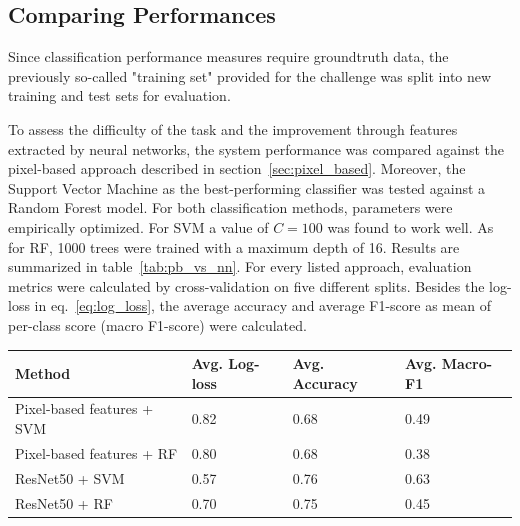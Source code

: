 \documentclass[11pt]{article}
\begin{document}
	\subsection{Comparing Performances}
	\label{sec:class_comparison}
	Since classification performance measures require groundtruth data, the previously so-called "training set" provided for the challenge was split into new training and test sets for evaluation.
		
	To assess the difficulty of the task and the improvement through features extracted by neural networks, the system performance was compared against the pixel-based approach described in section~\ref{sec:pixel_based}.
	Moreover, the Support Vector Machine as the best-performing classifier was tested against a Random Forest model. For both classification methods, parameters were empirically optimized. For SVM a value of $C=100$ was found to work well. As for RF, 1000 trees were trained with a maximum depth of 16. 
	Results are summarized in table~\ref{tab:pb_vs_nn}. For every listed approach, evaluation metrics were calculated by cross-validation on five different splits. Besides the log-loss in eq.~\ref{eq:log_loss}, the average accuracy and average F1-score as mean of per-class score (macro F1-score) were calculated.
	
	
	\begin{center}
		\bgroup
		\def\arraystretch{1.1}
		\begin{tabular}{ | m{5cm} | m{3cm} | m{3cm} | m{3cm} |} 
			
			\hline
			Method & Avg. Log-loss & Avg. Accuracy & Avg. Macro-F1 \\
			\hline
			\hline
			Pixel-based features + SVM & 0.82 & 0.68 & 0.49  \\
			\hline
			Pixel-based features + RF & 0.80 & 0.68 & 0.38  \\
			\hline
			ResNet50 + SVM & 0.57 & 0.76 & 0.63 \\
			\hline
			ResNet50 + RF & 0.70 & 0.75 & 0.45  \\
			\hline
		\end{tabular}
		\egroup
		\label{tab:pb_vs_nn}
	\end{center}
	
\end{document}
